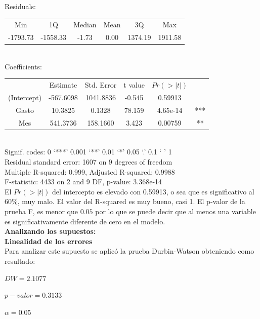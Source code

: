 \documentclass[12pt,a4paper]{article}
\begin{document}
	Residuals:\\
	
	\begin{tabular}{cccccc}
		Min&     1Q& Median& Mean&     3Q&    Max\\
		-1793.73&  -1558.33& -1.73&    0.00&   1374.19&   1911.58  
	\end{tabular}\\ 
	
	Coefficients:\\
	
	\begin{tabular}{cccccc}
		&     Estimate & Std. Error&     t value&   $Pr(>|t|)$&\\
		(Intercept) & -567.6098 & 1041.8836 &  -0.545  &  0.59913&\\
		Gasto      &   10.3825 &   0.1328  & 78.159  & 4.65e-14 &***\\
		Mes      &   541.3736 &   158.1660  & 3.423  & 0.00759 &**\\
	\end{tabular}\\
	
	Signif. codes:  0 ‘***’ 0.001 ‘**’ 0.01 ‘*’ 0.05 ‘.’ 0.1 ‘ ’ 1\\
	
	Residual standard error: 1607 on 9 degrees of freedom\\
	
	Multiple R-squared:  0.999,	Adjusted R-squared:  0.9988\\
	 
	F-statistic:  4433 on 2 and 9 DF,  p-value: 3.368e-14\\
	
	El $Pr(>|t|)$ del intercepto es elevado con 0.59913, o sea que es significativo al $60\%$, muy malo. El valor del R-squared es muy bueno, casi 1. El p-valor de la prueba F, es menor que $0.05$ por lo que se puede decir que al menos una variable es significativamente diferente de cero en el modelo.\\
	
	\textbf{Analizando los supuestos:}\\
	
	\textbf{Linealidad de los errores}\\
	Para analizar este supuesto se aplicó la prueba  Durbin-Watson obteniendo como resultado:
	
	\begin{center}
		$DW = 2.1077$
		
		$p-valor = 0.3133$
		
		$\alpha = 0.05$
	\end{center}
	
\end{document}
